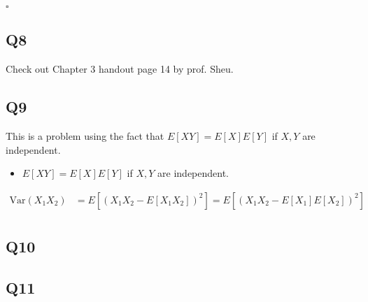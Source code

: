 \documentclass[12pt]{article}
\begin{document}
\hspace{\textwidth}\(\square\) 
\subsection*{Q8}
Check out Chapter 3 handout page 14 by prof. Sheu. 
\subsection*{Q9}
This is a problem using the fact that \textbf{\(E[XY] = E[X]E[Y]\) } if \(X,Y\) are independent. 
\begin{itemize}
    \item  \textbf{\(E[XY] = E[X]E[Y]\) } if \(X,Y\) are independent.
\end{itemize}


\begin{equation*}
    \begin{aligned}
        \text{Var} (X_1 X_2) &= E[(X_1 X_2 - E[X_1 X_2])^2] = E[(X_{1} X_2 - E[X_1]E[X_2] )^2]
        \\ &
    \end{aligned}
\end{equation*}
\subsection*{Q10}
\subsection*{Q11}
\end{document}
